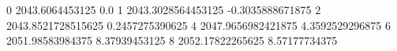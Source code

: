 0 2043.6064453125 0.0
1 2043.3028564453125 -0.3035888671875
2 2043.8521728515625 0.2457275390625
4 2047.9656982421875 4.3592529296875
6 2051.98583984375 8.37939453125
8 2052.17822265625 8.57177734375
